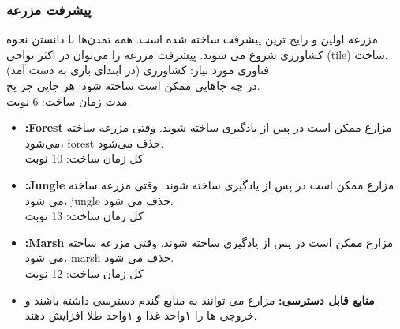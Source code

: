 \documentclass[]{article}
\begin{document}
\subsubsection*{{\titr پیشرفت مزرعه}}
مزرعه اولین و رایج ترین پیشرفت ساخته شده است. همه تمدن‌ها با دانستن نحوه کشاورزی شروع می شوند. پیشرفت مزرعه را می‌توان در اکثر نواحی (tile) ساخت.\\
فناوری مورد نیاز: کشاورزی (در ابتدای بازی به دست آمد)\\
در چه جاهایی ممکن است ساخته شود: هر جایی جز یخ.\\
مدت زمان ساخت: 6 نوبت
\begin{itemize}
	\item \textbf{:Forest}    مزارع ممکن است در  پس از یادگیری  ساخته شوند. وقتی مزرعه ساخته می‌شود، forest حذف می‌شود.\\
کل زمان ساخت: 10 نوبت

	\item \textbf{:Jungle} مزارع ممکن است در  پس از یادگیری  ساخته شوند. وقتی مزرعه ساخته می شود، jungle حذف می شود.\\
کل زمان ساخت: 13 نوبت

	\item \textbf{:Marsh} مزارع ممکن است در  پس از یادگیری  ساخته شوند. وقتی مزرعه ساخته می شود، marsh حذف می شود.\\
کل زمان ساخت: 12 نوبت

	\item \textbf{منابع قابل دسترسی:} مزارع می توانند به منابع گندم دسترسی داشته باشند و  خروجی ها را ۱واحد غذا و ۱واحد طلا افزایش دهند.

\end{itemize}
\end{document}
